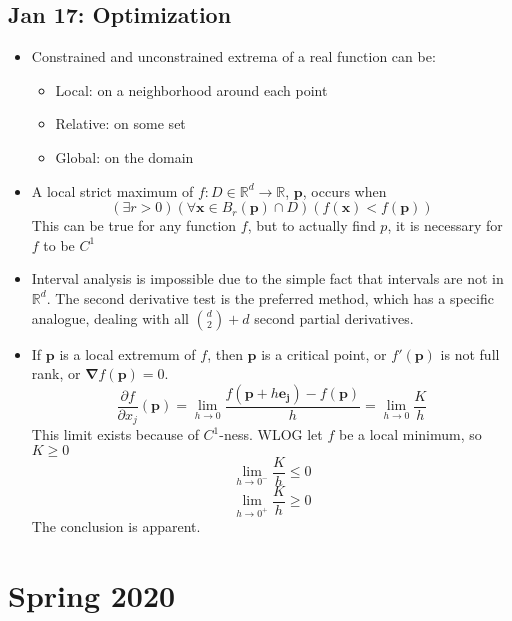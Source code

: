\documentclass[10pt, oneside]{article}
\newcommand{\del}{\partial}
\let\leq\leqslant
\let\geq\geqslant
\newcommand{\R}{\mathbb{R}}
\renewcommand{\vec}[1]{\mathbf{#1}}
\begin{document}
\subsection{Jan 17: Optimization}
\begin{itemize}
    \item Constrained and unconstrained extrema of a real function can be:
    \begin{itemize}
        \item Local: on a neighborhood around each point
        \item Relative: on some set
        \item Global: on the domain
    \end{itemize}
    \item A local strict maximum of $f: D \in \R^d \rightarrow \R$, $\vec{p}$, occurs when
        \[(\exists r > 0) (\forall \vec{x} \in B_r(\vec{p}) \cap D) (f(\vec{x}) < f(\vec{p}))\]
        This can be true for any function $f$, but to actually find $p$, it is necessary for $f$ to be $C^1$
    \item Interval analysis is impossible due to the simple fact that intervals are not in $\R^d$. The second derivative test is the preferred method, which has a specific analogue, dealing with all $\binom{d}{2} + d$ second partial derivatives.
    \item If $\vec{p}$ is a local extremum of $f$, then $\vec{p}$ is a critical point, or $f'(\vec{p})$ is not full rank, or $\vec{\nabla}f(\vec{p}) = 0$.
        \[\frac{\del f}{\del x_j} (\vec{p}) = \lim_{h \rightarrow 0} \frac{f(\vec{p} + h\vec{e_j}) - f(\vec{p})}{h} = \lim_{h \rightarrow 0} \frac{K}{h}\]
        This limit exists because of $C^1$-ness. WLOG let $f$ be a local minimum, so $K \geq 0$
        \[\lim_{h \rightarrow 0^-} \frac{K}{h} \leq 0\]
        \[\lim_{h \rightarrow 0^+} \frac{K}{h} \geq 0\]
        The conclusion is apparent.
\end{itemize}

\section{Spring 2020}
\end{document}
